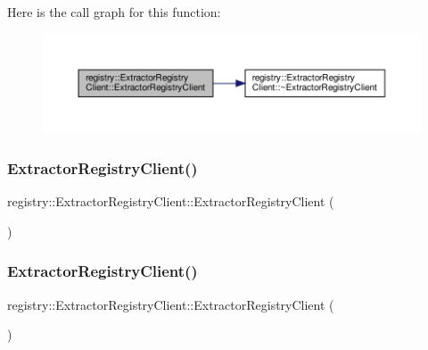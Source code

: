 Here is the call graph for this function\+:\nopagebreak
\begin{figure}[H]
\begin{center}
\leavevmode
\includegraphics[width=350pt]{classregistry_1_1ExtractorRegistryClient_a79e68c10ba8b6721529bf0b1f713f247_cgraph}
\end{center}
\end{figure}
\mbox{\label{classregistry_1_1ExtractorRegistryClient_aace253a20f811a9252355809552f4b95}} 
\subsubsection{\texorpdfstring{Extractor\+Registry\+Client()}{ExtractorRegistryClient()}\hspace{0.1cm}{\footnotesize\ttfamily [2/3]}}
{\footnotesize\ttfamily registry\+::\+Extractor\+Registry\+Client\+::\+Extractor\+Registry\+Client (\begin{DoxyParamCaption}\item[{\hyperlink{classregistry_1_1ExtractorRegistryClient}{Extractor\+Registry\+Client} const \&}]{ }\end{DoxyParamCaption})\hspace{0.3cm}{\ttfamily [delete]}}

\mbox{\label{classregistry_1_1ExtractorRegistryClient_a6f64a9ce2c92d5184b328720af9836a5}} 
\subsubsection{\texorpdfstring{Extractor\+Registry\+Client()}{ExtractorRegistryClient()}\hspace{0.1cm}{\footnotesize\ttfamily [3/3]}}
{\footnotesize\ttfamily registry\+::\+Extractor\+Registry\+Client\+::\+Extractor\+Registry\+Client (\begin{DoxyParamCaption}\item[{\hyperlink{classregistry_1_1ExtractorRegistryClient}{Extractor\+Registry\+Client} const \&\&}]{ }\end{DoxyParamCaption})\hspace{0.3cm}{\ttfamily [delete]}}


